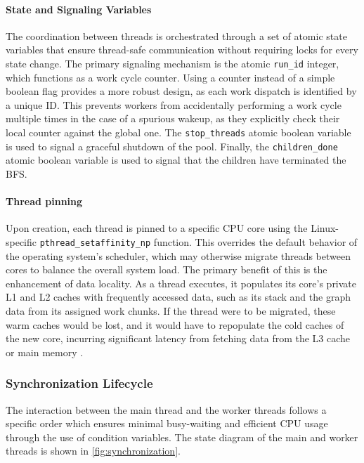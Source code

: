 \paragraph{State and Signaling Variables} The coordination between threads is orchestrated through a set of atomic state variables that ensure thread-safe communication without requiring locks for every state change. The primary signaling mechanism is the atomic \texttt{run\_id} integer, which functions as a work cycle counter. Using a counter instead of a simple boolean flag provides a more robust design, as each work dispatch is identified by a unique ID. This prevents workers from accidentally performing a work cycle multiple times in the case of a spurious wakeup, as they explicitly check their local counter against the global one. The \texttt{stop\_threads} atomic boolean variable is used to signal a graceful shutdown of the pool. Finally, the \texttt{children\_done} atomic boolean variable is used to signal that the children have terminated the BFS.

\paragraph{Thread pinning} Upon creation, each thread is pinned to a specific CPU core using the Linux-specific \texttt{pthread\_setaffinity\_np} function. This overrides the default behavior of the operating system's scheduler, which may otherwise migrate threads between cores to balance the overall system load. The primary benefit of this is the enhancement of data locality. As a thread executes, it populates its core's private L1 and L2 caches with frequently accessed data, such as its stack and the graph data from its assigned work chunks. If the thread were to be migrated, these warm caches would be lost, and it would have to repopulate the cold caches of the new core, incurring significant latency from fetching data from the L3 cache or main memory \cite{gandham2024occ}.

\vspace{0.5em}
\subsubsection{Synchronization Lifecycle} \label{sec:synchronization}
The interaction between the main thread and the worker threads follows a specific order which ensures minimal busy-waiting and efficient CPU usage through the use of condition variables. The state diagram of the main and worker threads is shown in \cref{fig:synchronization}.

